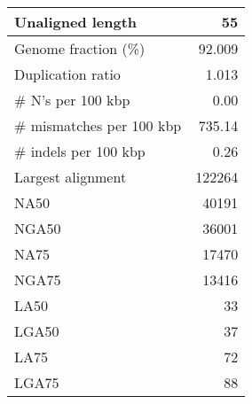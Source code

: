 \documentclass[12pt,a4paper]{article}
\begin{document}
\begin{table}[ht]
\begin{center}
\begin{tabular}{|l*{1}{|r}|}
Unaligned length & 55 \\ \hline
Genome fraction (\%) & 92.009 \\ \hline
Duplication ratio & 1.013 \\ \hline
\# N's per 100 kbp & 0.00 \\ \hline
\# mismatches per 100 kbp & 735.14 \\ \hline
\# indels per 100 kbp & 0.26 \\ \hline
Largest alignment & 122264 \\ \hline
NA50 & 40191 \\ \hline
NGA50 & 36001 \\ \hline
NA75 & 17470 \\ \hline
NGA75 & 13416 \\ \hline
LA50 & 33 \\ \hline
LGA50 & 37 \\ \hline
LA75 & 72 \\ \hline
LGA75 & 88 \\ \hline
\end{tabular}
\end{center}
\end{table}
\end{document}
